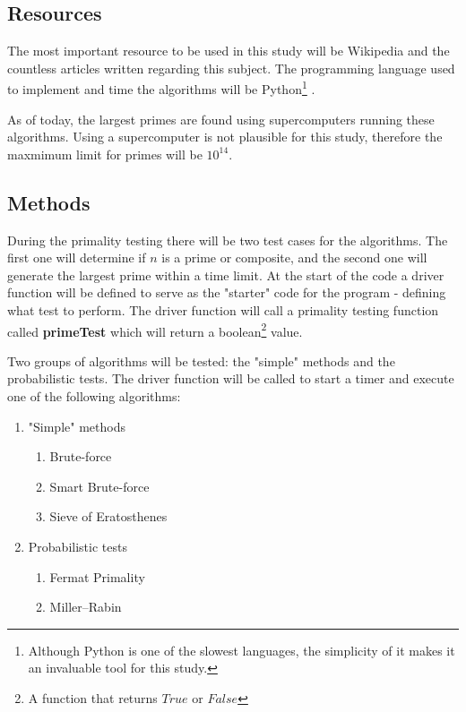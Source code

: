 \documentclass[main.tex]{subfiles}
\begin{document}
\subsection{Resources}

The most important resource to be used in this study will be Wikipedia and the countless articles written regarding this subject. The programming language used to implement and time the algorithms will be Python\footnote{Although Python is one of the slowest languages, the simplicity of it makes it an invaluable tool for this study.} \cite{python}.

As of today, the largest primes are found using supercomputers running these algorithms. Using a supercomputer is not plausible for this study, therefore the maxmimum limit for primes will be $10^{14}$.

\subsection{Methods}
During the primality testing \cite{prime:test} there will be two test cases for the algorithms. The first one will determine if $n$ is a prime or composite, and the second one will generate the largest prime within a time limit. At the start of the code a driver function will be defined to serve as the "starter" code for the program - defining what test to perform. The driver function will call a primality testing function called \textbf{primeTest} which will return a boolean\footnote{A function that returns $True$ or $False$} value. 

Two groups of algorithms will be tested: the "simple" methods and the probabilistic tests. The driver function will be called to start a timer and execute one of the following algorithms:
\begin{enumerate}
    \item "Simple" methods
    \begin{enumerate}
        \item Brute-force%
        \item Smart Brute-force %
        \item Sieve of Eratosthenes \cite{prime:sieve}
    \end{enumerate}
    \item Probabilistic tests \cite{prime:test}
    \begin{enumerate}
        \item Fermat Primality
        \item Miller–Rabin
    \end{enumerate}
\end{enumerate}
\end{document}

